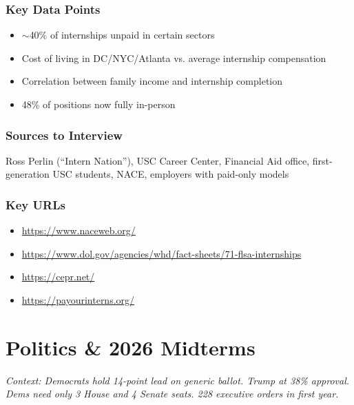 \documentclass[11pt,letterpaper]{article}
\begin{document}
\subsubsection*{Key Data Points}
\begin{itemize}[noitemsep]
    \item $\sim$40\% of internships unpaid in certain sectors
    \item Cost of living in DC/NYC/Atlanta vs. average internship compensation
    \item Correlation between family income and internship completion
    \item 48\% of positions now fully in-person
\end{itemize}

\subsubsection*{Sources to Interview}
Ross Perlin (``Intern Nation''), USC Career Center, Financial Aid office, first-generation USC students, NACE, employers with paid-only models

\subsubsection*{Key URLs}
\begin{itemize}[noitemsep]
    \item \url{https://www.naceweb.org/}
    \item \url{https://www.dol.gov/agencies/whd/fact-sheets/71-flsa-internships}
    \item \url{https://cepr.net/}
    \item \url{https://payourinterns.org/}
\end{itemize}

\newpage
\section{Politics \& 2026 Midterms}

\textit{Context: Democrats hold 14-point lead on generic ballot. Trump at 38\% approval. Dems need only 3 House and 4 Senate seats. 228 executive orders in first year.}

\newpage
\end{document}
